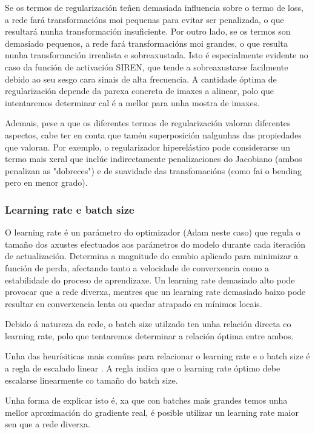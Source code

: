 Se os termos de regularización teñen demasiada influencia sobre o termo de loss, a rede fará transformacións moi pequenas para evitar ser penalizada, o que resultará nunha transformación insuficiente.
Por outro lado, se os termos son demasiado pequenos, a rede fará transformacións moi grandes, o que resulta nunha transformación irrealista e sobreaxustada. Isto é especialmente evidente no caso da función de activación SIREN, que tende a sobreaxustarse facilmente debido ao seu sesgo cara sinais de alta frecuencia.
A cantidade óptima de regularización depende da parexa concreta de imaxes a alinear, polo que intentaremos determinar cal é a mellor para unha mostra de imaxes.

Ademais, pese a que os diferentes termos de regularización valoran diferentes aspectos, cabe ter en conta que tamén superposición nalgunhas das propiedades que valoran.
Por exemplo, o regularizador hiperelástico pode considerarse un termo mais xeral que inclúe indirectamente penalizaciones do Jacobiano (ambos penalizan as "dobreces") e de suavidade das transfomacións (como fai o bending pero en menor grado).

\subsubsection{Learning rate e batch size}
\label{subsubsec:Learning rate e batch size}

O learning rate é un parámetro do optimizador (Adam neste caso) que regula o tamaño dos axustes efectuados aos parámetros do modelo durante cada iteración de actualización. 
Determina a magnitude do cambio aplicado para minimizar a función de perda, afectando tanto a velocidade de converxencia como a estabilidade do proceso de aprendizaxe.
Un learning rate demasiado alto pode provocar que a rede diverxa, mentres que un learning rate demasiado baixo pode resultar en converxencia lenta ou quedar atrapado en mínimos locais.

Debido á natureza da rede, o batch size utilzado ten unha relación directa co learning rate, polo que tentaremos determinar a relación óptima entre ambos.

Unha das heurísiticas mais comúns para relacionar o learning rate e o batch size é a regla de escalado linear \cite{goyal2018accuratelargeminibatchsgd}. 
A regla indica que o learning rate óptimo debe escalarse linearmente co tamaño do batch size. 

Unha forma de explicar isto é, xa que con batches mais grandes temos unha mellor aproximación do gradiente real, é posible utilizar un learning rate maior sen que a rede diverxa.

